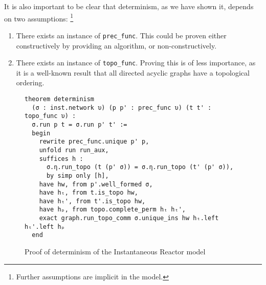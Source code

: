 \noindent It is also important to be clear that determinism, as we have shown it, depends on two assumptions: \footnote{Further assumptions are implicit in the model.} 

\begin{enumerate}
  \item There exists an instance of \lstinline{prec_func}. 
  This could be proven either constructively by providing an algorithm, or non-constructively.
  \item There exists an instance of \lstinline{topo_func}. 
  Proving this is of less importance, as it is a well-known result that all directed acyclic graphs have a topological ordering.
\end{enumerate}

\begin{figure}[htbp!]
\begin{lstlisting}
theorem determinism 
  (σ : inst.network υ) (p p' : prec_func υ) (t t' : topo_func υ) : 
  σ.run p t = σ.run p' t' := 
  begin
    rewrite prec_func.unique p' p,
    unfold run run_aux,
    suffices h : 
      σ.η.run_topo (t (p' σ)) = σ.η.run_topo (t' (p' σ)), 
      by simp only [h],
    have hw, from p'.well_formed σ,
    have hₜ, from t.is_topo hw,
    have hₜ', from t'.is_topo hw,
    have hₚ, from topo.complete_perm hₜ hₜ',
    exact graph.run_topo_comm σ.unique_ins hw hₜ.left hₜ'.left hₚ
  end
\end{lstlisting}
\caption{Proof of determinism of the Instantaneous Reactor model}
\label{fig:proof}
\end{figure}